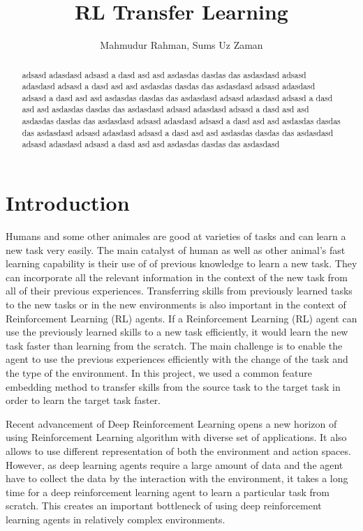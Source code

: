 \documentclass[letterpaper, 11 pt, conference]{ieeeconf}  %
\title{\LARGE \bf
RL Transfer Learning
}
\author{Mahmudur Rahman, Sums Uz Zaman}
\begin{document}
\maketitle
\thispagestyle{empty}
\pagestyle{empty}


\begin{abstract}

adsasd adasdasd  adsasd a dasd asd asd asdasdas dasdas das asdasdasd adsasd adasdasd  adsasd a dasd asd asd asdasdas dasdas das asdasdasd adsasd adasdasd  adsasd a dasd asd asd asdasdas dasdas das asdasdasd adsasd adasdasd  adsasd a dasd asd asd asdasdas dasdas das asdasdasd adsasd adasdasd  adsasd a dasd asd asd asdasdas dasdas das asdasdasd adsasd adasdasd  adsasd a dasd asd asd asdasdas dasdas das asdasdasd adsasd adasdasd  adsasd a dasd asd asd asdasdas dasdas das asdasdasd adsasd adasdasd  adsasd a dasd asd asd asdasdas dasdas das asdasdasd

\end{abstract}


\section{Introduction}

Humans and some other animales are good at varieties of tasks and can learn a new task very easily. The main catalyst of human as well as other animal's fast learning capability is  their use of of previous knowledge to learn a new task. They can incorporate all the relevant information in the context of the new task from all of their previous experiences. Transferring skills from previously learned tasks to the new tasks or in the new environments is also important in the context of Reinforcement Learning (RL)\cite{sutton1998introduction} agents. If a Reinforcement Learning (RL) agent can use the previously learned skills to a new task efficiently, it would learn the new task faster than learning from the scratch. The main challenge is to enable the agent to use the previous experiences efficiently with the change of the task and the type of the environment. In this project, we used a common feature embedding method to transfer skills from the source task to the target task in order to learn the target task faster. 
\linebreak
\par Recent advancement of Deep Reinforcement Learning\cite{mnih2013playing} opens a new horizon of using Reinforcement Learning algorithm with diverse set of applications. It also allows to use different representation of both the environment and action spaces. However, as deep learning agents require a large amount of data and the agent have to collect the data by the interaction with the environment, it takes a long time for a deep reinforcement learning agent to learn a particular task from scratch. This creates an important bottleneck of using deep reinforcement learning agents in relatively complex environments. 



\end{document}
